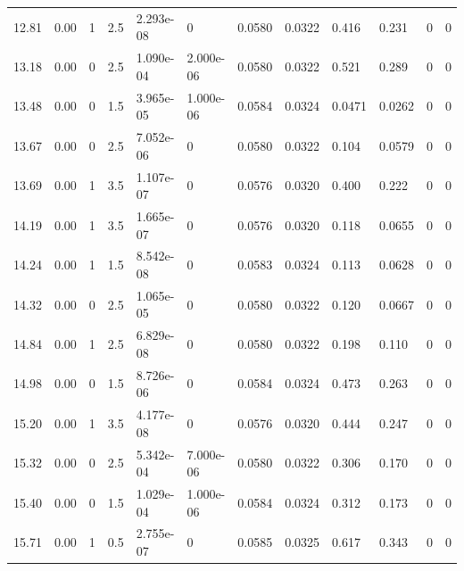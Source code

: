 \documentclass[preview]{standalone}
\begin{document}
{{{\begin{tabular}{L{1.2cm}C{1.2cm} C{0.3cm}C{0.5cm} C{1.4cm}C{1.4cm} C{1.4cm}C{1.4cm} C{1.6cm}C{1.6cm} C{1.6cm}C{1.6cm}}
  12.81  &  0.00  & 1     & 2.5 &  2.293e-08  & 0  &  0.0580&   0.0322& 0.416 & 0.231   &  0 & 0  \\ 
  13.18  &  0.00  & 0     & 2.5 &  1.090e-04  & 2.000e-06  &  0.0580&   0.0322& 0.521 & 0.289   &  0 & 0  \\ 
  13.48  &  0.00  & 0     & 1.5 &  3.965e-05  & 1.000e-06  &  0.0584&   0.0324& 0.0471 & 0.0262   &  0 & 0  \\ 
  13.67  &  0.00  & 0     & 2.5 &  7.052e-06  & 0  &  0.0580&   0.0322& 0.104 & 0.0579   &  0 & 0  \\ 
  13.69  &  0.00  & 1     & 3.5 &  1.107e-07  & 0  &  0.0576&   0.0320& 0.400 & 0.222   &  0 & 0  \\ 
  14.19  &  0.00  & 1     & 3.5 &  1.665e-07  & 0  &  0.0576&   0.0320& 0.118 & 0.0655   &  0 & 0  \\ 
  14.24  &  0.00  & 1     & 1.5 &  8.542e-08  & 0  &  0.0583&   0.0324& 0.113 & 0.0628   &  0 & 0  \\ 
  14.32  &  0.00  & 0     & 2.5 &  1.065e-05  & 0  &  0.0580&   0.0322& 0.120 & 0.0667   &  0 & 0  \\ 
  14.84  &  0.00  & 1     & 2.5 &  6.829e-08  & 0  &  0.0580&   0.0322& 0.198 & 0.110   &  0 & 0  \\ 
  14.98  &  0.00  & 0     & 1.5 &  8.726e-06  & 0  &  0.0584&   0.0324& 0.473 & 0.263   &  0 & 0  \\ 
  15.20  &  0.00  & 1     & 3.5 &  4.177e-08  & 0  &  0.0576&   0.0320& 0.444 & 0.247   &  0 & 0  \\ 
  15.32  &  0.00  & 0     & 2.5 &  5.342e-04  & 7.000e-06  &  0.0580&   0.0322& 0.306 & 0.170   &  0 & 0  \\ 
  15.40  &  0.00  & 0     & 1.5 &  1.029e-04  & 1.000e-06  &  0.0584&   0.0324& 0.312 & 0.173   &  0 & 0  \\ 
  15.71  &  0.00  & 1     & 0.5 &  2.755e-07  & 0  &  0.0585&   0.0325& 0.617 & 0.343   &  0 & 0  \\ 
\hline 
\end{tabular} 

}}}
\end{document}
